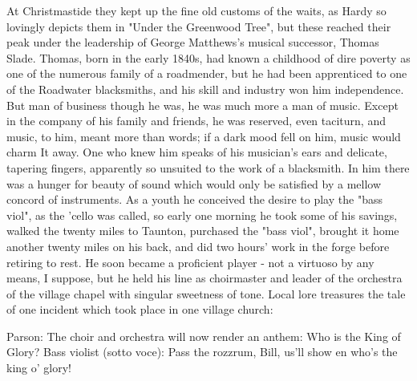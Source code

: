 At Christmastide they kept up the fine old customs of the waits, as Hardy so lovingly depicts them in "Under the Greenwood Tree", but these reached their peak under the leadership of George Matthews's musical successor, Thomas Slade. Thomas, born in the early 1840s, had known a childhood of dire poverty as one of the numerous family of a roadmender, but he had been apprenticed to one of the Roadwater blacksmiths, and his skill and industry won him independence. But man of business though he was, he was much more a man of music. Except in the company of his family and friends, he was reserved, even taciturn, and music, to him, meant more than words; if a dark mood fell on him, music would charm It away. One who knew him speaks of his musician's ears and delicate, tapering fingers, apparently so unsuited to the work of a blacksmith. In him there was a hunger for beauty of sound which would only be satisfied by a mellow concord of instruments. As a youth he conceived the desire to play the "bass viol", as the 'cello was called, so early one morning he took some of his savings, walked the twenty miles to Taunton, purchased the "bass viol", brought it home another twenty miles on his back, and did two hours' work in the forge before retiring to rest. He soon became a proficient player - not a virtuoso by any means, I suppose, but he held his line as choirmaster and leader of the orchestra of the village chapel with singular sweetness of tone. Local lore treasures the tale of one incident which took place in one village church:

Parson: The choir and orchestra will now render an anthem: Who is the King of Glory?
Bass violist (sotto voce): Pass the rozzrum, Bill, us'll show en who’s the king o’ glory!


